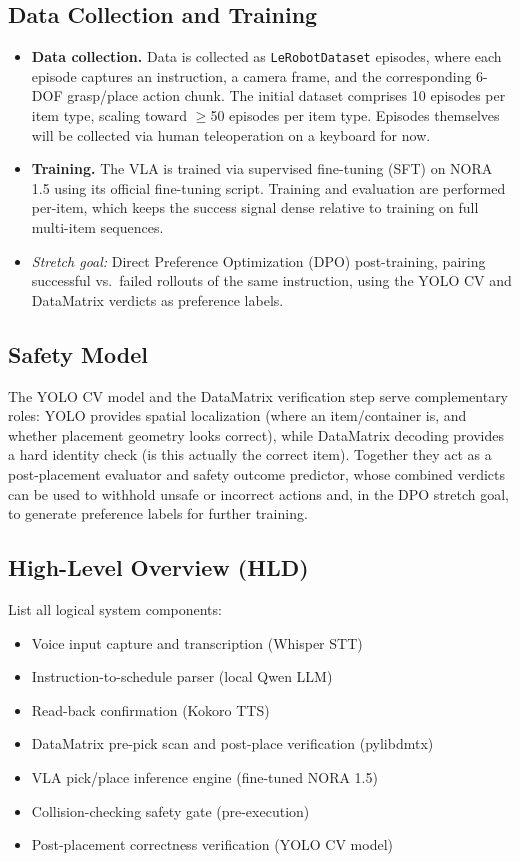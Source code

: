 \documentclass[12pt,a4paper]{article}
\begin{document}
\subsection{Data Collection and Training}
 
\begin{itemize}
  \item \textbf{Data collection.} Data is collected as \texttt{LeRobotDataset} episodes, where each episode captures an instruction, a camera frame, and the corresponding 6-DOF grasp/place action chunk. The initial dataset comprises 10 episodes per item type, scaling toward $\geq$50 episodes per item type. Episodes themselves will be collected via human teleoperation on a keyboard for now.
  \item \textbf{Training.} The VLA is trained via supervised fine-tuning (SFT) on NORA 1.5 using its official fine-tuning script. Training and evaluation are performed per-item, which keeps the success signal dense relative to training on full multi-item sequences.
  \item \textit{Stretch goal:} Direct Preference Optimization (DPO) post-training, pairing successful vs.\ failed rollouts of the same instruction, using the YOLO CV and DataMatrix verdicts as preference labels.
\end{itemize}
 
\subsection{Safety Model}
 
The YOLO CV model and the DataMatrix verification step serve complementary roles: YOLO provides spatial localization (where an item/container is, and whether placement geometry looks correct), while DataMatrix decoding provides a hard identity check (is this actually the correct item). Together they act as a post-placement evaluator and safety outcome predictor, whose combined verdicts can be used to withhold unsafe or incorrect actions and, in the DPO stretch goal, to generate preference labels for further training.
 
\subsection{High-Level Overview (HLD)}
List all logical system components:
\begin{itemize}
  \item Voice input capture and transcription (Whisper STT)
  \item Instruction-to-schedule parser (local Qwen LLM)
  \item Read-back confirmation (Kokoro TTS)
  \item DataMatrix pre-pick scan and post-place verification (pylibdmtx)
  \item VLA pick/place inference engine (fine-tuned NORA 1.5)
  \item Collision-checking safety gate (pre-execution)
  \item Post-placement correctness verification (YOLO CV model)
\end{itemize}
 
\end{document}
